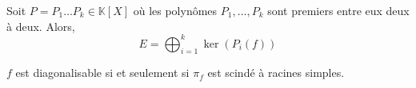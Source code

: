 	
	\begin{theorem}
		Soit $P = P_1 \dots P_k \in \mathbb{K}[X]$ où les polynômes $P_1, \dots, P_k$ sont premiers entre eux deux à deux. Alors,
		\[ E = \bigoplus_{i=1}^k \ker(P_i(f)) \]
	\end{theorem}
	
	\begin{application}
		$f$ est diagonalisable si et seulement si $\pi_f$ est scindé à racines simples.
	\end{application}

